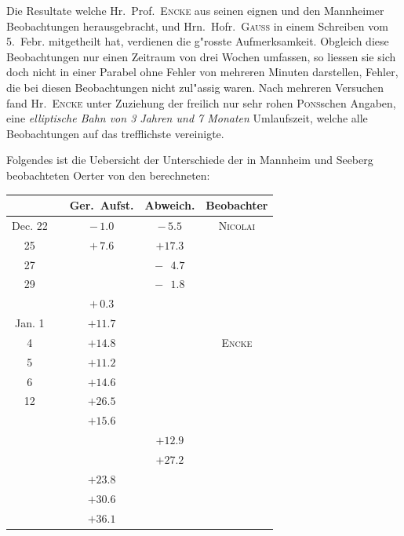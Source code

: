 \documentclass[12pt,a4paper]{article}
\begin{document}
\newpage

Die Resultate welche Hr.~Prof.~\textsc{Encke} aus seinen eignen und den Mannheimer Beobachtungen
herausgebracht, und Hrn.~Hofr.~\textsc{Gauss} in einem Schreiben vom 5.~Febr. mitgetheilt hat, verdienen die
g"rosste Aufmerksamkeit. Obgleich diese Beobachtungen nur einen Zeitraum von drei Wochen umfassen,
so liessen sie sich doch nicht in einer Parabel ohne Fehler von mehreren Minuten darstellen, Fehler, die
bei diesen Beobachtungen nicht zul"assig waren. Nach mehreren Versuchen fand Hr.~\textsc{Encke} unter
Zuziehung der freilich nur sehr rohen \textsc{Pons}schen Angaben, eine \textit{elliptische Bahn von 3 Jahren und
7 Monaten} Umlaufszeit, welche alle Beobachtungen auf das trefflichste vereinigte.

Folgendes ist die Uebersicht der Unterschiede der in Mannheim und Seeberg beobachteten Oerter
von den berechneten:

\begin{center}
\small
\begin{tabular}{c|c|c|c|c}
\toprule
& & Ger.~Aufst. & Abweich. & Beobachter \\
\midrule
Dec. 22 & & $-\,1.0$ & $-\,5.5$ & \textsc{Nicolai} \\
\phantom{22} 25 & & $+\,7.6$ & $+17.3$ & \\
\phantom{22} 27 & & & $-\,\phantom{0}4.7$ & \\
\phantom{22} 29 & & & $-\,\phantom{0}1.8$ & \\
\phantom{22} & & $+\,0.3$ & & \\
Jan. \phantom{0}1 & & $+11.7$ & & \\
\phantom{0}\phantom{0} \phantom{0}4 & & $+14.8$ & & \textsc{Encke} \\
\phantom{0}\phantom{0} \phantom{0}5 & & $+11.2$ & & \\
\phantom{0}\phantom{0} \phantom{0}6 & & $+14.6$ & & \\
\phantom{0}\phantom{0} 12 & & $+26.5$ & & \\
\phantom{0}\phantom{0} & & $+15.6$ & & \\
\phantom{0}\phantom{0} & & & $+12.9$ & \\
\phantom{0}\phantom{0} & & & $+27.2$ & \\
\phantom{0}\phantom{0} & & $+23.8$ & & \\
\phantom{0}\phantom{0} & & $+30.6$ & & \\
\phantom{0}\phantom{0} & & $+36.1$ & & \\
\bottomrule
\end{tabular}
\end{center}
\end{document}
